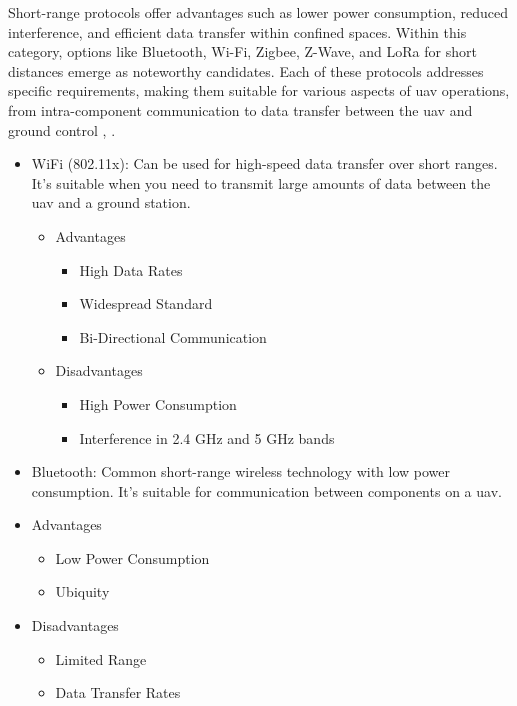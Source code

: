 Short-range protocols offer advantages such as lower power consumption, reduced interference, and efficient data transfer within confined spaces.
Within this category, options like Bluetooth, Wi-Fi, Zigbee, Z-Wave, and LoRa for short distances emerge as noteworthy candidates.
Each of these protocols addresses specific requirements, making them suitable for various aspects of \gls{uav} operations, from intra-component communication to data transfer between the \gls{uav} and ground control \cite{WCOM6}, \cite{WCOM7}.

\begin{itemize}
    \item WiFi (802.11x): Can be used for high-speed data transfer over short ranges. It's suitable when you need to transmit large amounts of data between the \gls{uav} and a ground station.
        \begin{itemize}
            \item Advantages
                \begin{itemize}
                    \item High Data Rates
                    \item Widespread Standard
                    \item Bi-Directional Communication
                \end{itemize}
            \item Disadvantages 
                \begin{itemize}     
                    \item High Power Consumption
                    \item Interference in 2.4 GHz and 5 GHz bands
                \end{itemize}
        \end{itemize}
        
\item Bluetooth: Common short-range wireless technology with low power consumption. It's suitable for communication between components on a \gls{uav}.
    \item Advantages 
        \begin{itemize}
            \item Low Power Consumption
            \item Ubiquity
        \end{itemize}
    \item Disadvantages 
        \begin{itemize}
            \item Limited Range
            \item Data Transfer Rates
        \end{itemize}
        

\end{itemize}
